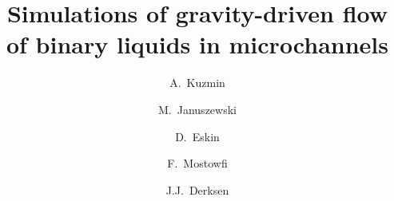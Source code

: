 \documentclass[preprint,12pt]{elsarticle}
\begin{document}
\begin{frontmatter}


\title{Simulations of gravity-driven flow of binary liquids in microchannels}


\author[uofa]{A.~Kuzmin}
\author[us]{M.~Januszewski}
\author[schlum]{D.~Eskin}
\author[schlum]{F.~Mostowfi}
\author[uofa]{J.J.~Derksen}
\address[uofa]{Chemical and Materials Engineering, University of Alberta\\ 7th Floor, ECERF, 9107
116 St, Edmonton, Alberta, T6G
2V4 Canada}
\address[us]{Insitute of Physics, University of Silesia, 40-007 Katowice, Poland}
\address[schlum]{DBR Schlumberger Technology Center\\ 9450 17 Ave NW, Edmonton, Alberta, T6N 1M9
Canada}


\end{frontmatter}
\end{document}
